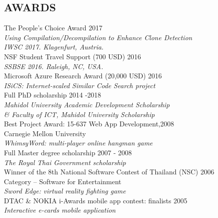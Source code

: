 \documentclass[margin, 10pt]{res} %
\begin{document}
\begin{resume}
\section{AWARDS}
The People's Choice Award \hfill 2017 \\ 
\textit{Using Compilation/Decompilation to Enhance Clone Detection} \\
\textit{IWSC 2017. Klagenfurt, Austria.} \vspace{2mm} \\
NSF Student Travel Support (700 USD) \hfill 2016 \\ 
\textit{SSBSE 2016. Raleigh, NC, USA.} \vspace{2mm} \\
Microsoft Azure Research Award (20,000 USD) \hfill 2016 \\ 
\textit{ISiCS: Internet-scaled Similar Code Search project} \vspace{2mm} \\
Full PhD scholarship \hfill 2014 -2018 \\
\textit{Mahidol University Academic Development Scholarship \\ 
\& Faculty of ICT, Mahidol University Scholarship} \vspace{2mm} \\
Best Project Award: 15-637 Web App Development,\hfill 2008 \\Carnegie Mellon University \\ 
\textit{WhimsyWord: multi-player online hangman game} \vspace{2mm} \\
Full Master degree scholarship \hfill 2007 - 2008 \\
\textit{The Royal Thai Government scholarship} \vspace{2mm} \\
Winner of the 8th National Software Contest of Thailand (NSC) \hfill 2006 \\ 
Category -- Software for Entertainment \\
\textit{Sword Edge: virtual reality fighting game} \vspace{2mm} \\
DTAC \& NOKIA i-Awards mobile app contest: finalists \hfill 2005  \\
\textit{Interactive e-cards mobile application}
 
 

\end{resume}
\end{document}
